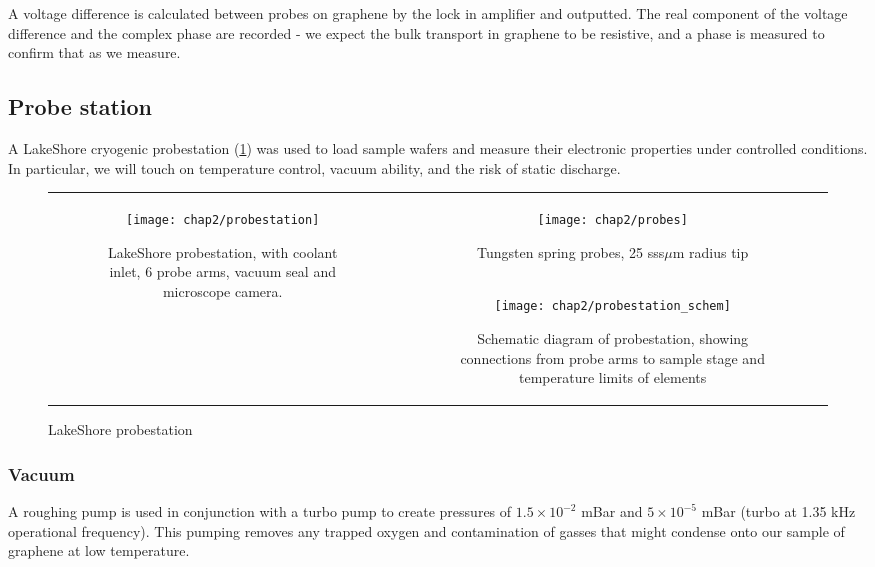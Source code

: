 \documentclass[../../Matt_Gebert_Honours_Thesis.tex]{subfiles}
\begin{document}
	A voltage difference is calculated between probes on graphene by the lock in amplifier and outputted. The real component of the voltage difference and the complex phase are recorded - we expect the bulk transport in graphene to be resistive, and a phase is measured to confirm that as we measure.
	
	\subsection{Probe station}\label{sec:probestation}
	A LakeShore cryogenic probestation (\cref{fig:probestation}) was used to load sample wafers and measure their electronic properties under controlled conditions. In particular, we will touch on temperature control, vacuum ability, and the risk of static discharge.
		
	\begin{figure}[H]
		\centering
		\begin{tabular}[b]{cc}
			\multirow{2}{*}[1.5cm]{
				\centering
				\begin{subfigure}{0.55\textwidth}
					\centering
					\texttt{[image: chap2/probestation]}
					\caption{LakeShore probestation, with coolant inlet, 6 probe arms, vacuum seal and microscope camera.}
				\end{subfigure}
			}
			&\begin{subfigure}{0.4\textwidth}
				\centering
				\texttt{[image: chap2/probes]}
				\caption{Tungsten spring probes, 25 sss$\mu$m radius tip}
			\end{subfigure}\vspace{0.5cm}\\
			&\begin{subfigure}[b]{0.4\textwidth}
				\texttt{[image: chap2/probestation\_schem]}
				\caption[Schematic diagram of probestation]{Schematic diagram of probestation, showing connections from probe arms to sample stage and temperature limits of elements}
			\end{subfigure}\\
		\end{tabular}
		\caption[LakeShore Probestation]{LakeShore probestation}\label{fig:probestation}
	\end{figure}
	
	\subsubsection{Vacuum}
	A roughing pump is used in conjunction with a turbo pump to create pressures of $1.5\times10^{-2}$ mBar and $5\times10^{-5}$ mBar (turbo at 1.35 kHz operational frequency). %
	This pumping removes any trapped oxygen and contamination of gasses that might condense onto our sample of graphene at low temperature.
	
\end{document}
